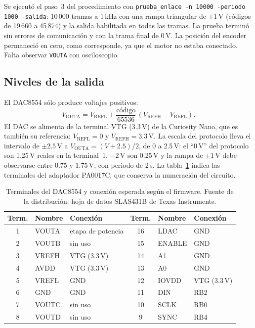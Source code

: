 \documentclass[11pt]{article}
\newcommand{\code}[1]{\texttt{#1}}
\begin{document}
Se ejecutó el paso~3 del procedimiento con \code{prueba\_enlace -n 10000
-periodo 1000 -salida}: 10\,000 tramas a 1\,kHz con una rampa triangular de
$\pm1$\,V (códigos de 19\,660 a 45\,874) y la salida habilitada en todas las
tramas. La prueba terminó sin errores de comunicación y con la trama final de
0\,V. La posición del encoder permaneció en cero, como corresponde, ya que el
motor no estaba conectado. Falta observar \code{VOUTA} con osciloscopio.

\subsection{Niveles de la salida}

El DAC8554 sólo produce voltajes positivos:
\begin{equation*}
V_{\text{OUTA}} = V_{\text{REFL}} + \frac{\text{código}}{65536}\,
                  \left(V_{\text{REFH}} - V_{\text{REFL}}\right).
\end{equation*}
El DAC se alimenta de la terminal VTG (3.3\,V) de la Curiosity Nano, que es
también su referencia: $V_{\text{REFL}} = 0$ y $V_{\text{REFH}} = 3.3$\,V.
La escala del protocolo lleva el intervalo de $\pm2.5$\,V a
$V_{\text{OUTA}} = (V + 2.5)/2$, de 0 a 2.5\,V: el ``0\,V'' del protocolo
son 1.25\,V reales en la terminal~1, $-2$\,V son 0.25\,V y la rampa de
$\pm1$\,V debe observarse entre 0.75 y 1.75\,V, con periodo de 2\,s. La
tabla~\ref{tab:dac} indica las terminales del adaptador PA0017C, que
conserva la numeración del circuito.

\begin{table}[H]
\centering
\small
\begin{tabular}{@{}cll|cll@{}}
\toprule
Term. & Nombre & Conexión & Term. & Nombre & Conexión \\
\midrule
1 & VOUTA & etapa de potencia & 16 & LDAC & GND \\
2 & VOUTB & sin uso & 15 & ENABLE & GND \\
3 & VREFH & VTG (3.3\,V) & 14 & A1 & GND \\
4 & AVDD & VTG (3.3\,V) & 13 & A0 & GND \\
5 & VREFL & GND & 12 & IOVDD & VTG (3.3\,V) \\
6 & GND & GND & 11 & DIN & RB2 \\
7 & VOUTC & sin uso & 10 & SCLK & RB0 \\
8 & VOUTD & sin uso & 9 & SYNC & RB4 \\
\bottomrule
\end{tabular}
\caption{Terminales del DAC8554 y conexión esperada según el firmware.
Fuente de la distribución: hoja de datos SLAS431B de Texas Instruments.}
\label{tab:dac}
\end{table}
\end{document}
